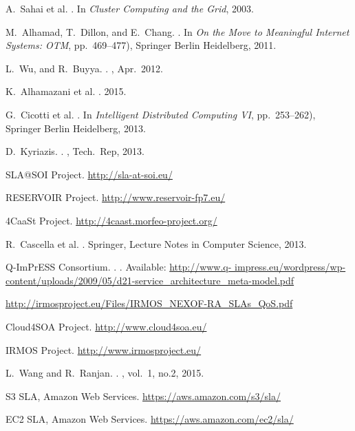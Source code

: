 \begin{thebibliography}{10}
A.~Sahai et al.
.
\newblock In {\em Cluster Computing and the Grid}, 2003.

M.~Alhamad, T.~Dillon, and E.~Chang.
.
\newblock In {\em On the Move to Meaningful Internet Systems: OTM}, pp.~469--477), Springer Berlin Heidelberg, 2011.

L.~Wu, and R.~Buyya.
.
, Apr.~2012.

K.~Alhamazani et al.
.
2015.

G.~Cicotti et al.
.
\newblock In {\em Intelligent Distributed Computing VI}, pp.~253--262), Springer Berlin Heidelberg, 2013.

D.~Kyriazis.
.
, Tech.~Rep, 2013.

SLA@SOI Project.
\newblock \url{http://sla-at-soi.eu/}

RESERVOIR Project.
\newblock \url{http://www.reservoir-fp7.eu/}

4CaaSt Project.
\newblock \url{http://4caast.morfeo-project.org/}

R.~Cascella et al.
.
Springer, Lecture Notes in Computer Science, 2013.

Q-ImPrESS Consortium.
.
.
Available: \url{http://www.q- impress.eu/wordpress/wp-content/uploads/2009/05/d21-service_architecture_meta-model.pdf}

\newblock \url{http://irmosproject.eu/Files/IRMOS_NEXOF-RA_SLAs_QoS.pdf}

Cloud4SOA Project.
\newblock \url{http://www.cloud4soa.eu/}

IRMOS Project.
\newblock \url{http://www.irmosproject.eu/}

L.~Wang and R.~Ranjan.
.
, vol.~1, no.2, 2015.

S3 SLA, Amazon Web Services.
\newblock \url{https://aws.amazon.com/s3/sla/}

EC2 SLA, Amazon Web Services.
\newblock \url{https://aws.amazon.com/ec2/sla/}

\end{thebibliography}



